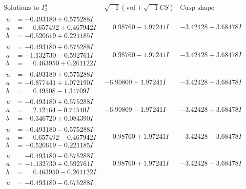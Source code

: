 \documentclass[1p]{elsarticle_modified}
\theoremstyle{definition}
\newcommand{\I}{\sqrt{-1}}
\begin{document}
$$\begin{array}{c|c|c}  
\text{Solutions to }I^u_{3}& \I (\text{vol} + \sqrt{-1}CS) & \text{Cusp shape}\\
 \hline 
\begin{aligned}
u &= -0.493180 + 0.575288 I \\
a &= \phantom{-}0.657492 + 0.467942 I \\
b &= -0.520619 + 0.221185 I\end{aligned}
 & \phantom{-}0.98760 - 1.97241 I & -3.42428 + 3.68478 I \\ \hline\begin{aligned}
u &= -0.493180 + 0.575288 I \\
a &= -1.132730 - 0.592761 I \\
b &= \phantom{-}0.463950 + 0.261122 I\end{aligned}
 & \phantom{-}0.98760 - 1.97241 I & -3.42428 + 3.68478 I \\ \hline\begin{aligned}
u &= -0.493180 + 0.575288 I \\
a &= -0.877441 + 1.072190 I \\
b &= \phantom{-}0.49508 - 1.34709 I\end{aligned}
 & -6.90809 - 1.97241 I & -3.42428 + 3.68478 I \\ \hline\begin{aligned}
u &= -0.493180 + 0.575288 I \\
a &= \phantom{-}2.12164 - 0.74540 I \\
b &= -0.346720 + 0.084390 I\end{aligned}
 & -6.90809 - 1.97241 I & -3.42428 + 3.68478 I \\ \hline\begin{aligned}
u &= -0.493180 - 0.575288 I \\
a &= \phantom{-}0.657492 - 0.467942 I \\
b &= -0.520619 - 0.221185 I\end{aligned}
 & \phantom{-}0.98760 + 1.97241 I & -3.42428 - 3.68478 I \\ \hline\begin{aligned}
u &= -0.493180 - 0.575288 I \\
a &= -1.132730 + 0.592761 I \\
b &= \phantom{-}0.463950 - 0.261122 I\end{aligned}
 & \phantom{-}0.98760 + 1.97241 I & -3.42428 - 3.68478 I \\ \hline\begin{aligned}
u &= -0.493180 - 0.575288 I \\

\end{aligned}
\end{array}$$
\end{document}
